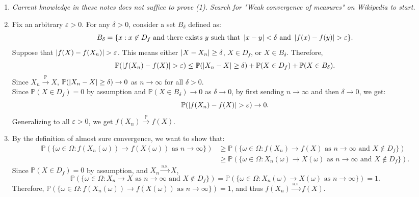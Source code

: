 \documentclass{huhtakm-template-book-v2}
\newcommand{\prob}{\mathbb{P}}
\begin{document}
    \begin{proofing}
        \begin{enumerate}
            \item \textit{Current knowledge in these notes does not suffice to prove (1). Search for "Weak convergence of measures" on Wikipedia to start.}
            \item Fix an arbitrary $\varepsilon > 0$. For any $\delta > 0$, consider a set $B_{\delta}$ defined as:
            \begin{equation*}
                B_{\delta} = \{x:x \not \in D_{f}\text{ and there exists }y\text{ such that }\left|{x-y}\right| < \delta\text{ and }\left|{f(x)-f(y)}\right| > \varepsilon\}.
            \end{equation*}
            Suppose that $\left|{f(X)-f(X_{n})}\right| > \varepsilon$. This means either $\left|{X-X_{n}}\right| \geq \delta$, $X \in D_{f}$, or $X \in B_{\delta}$. Therefore,
            \begin{equation*}
                \prob(\abs{f(X_{n})-f(X)} > \varepsilon) \leq \prob(\abs{X_{n}-X} \geq \delta)+\prob(X \in D_{f})+\prob(X \in B_{\delta}).
            \end{equation*}
            Since $X_{n} \xrightarrow{\prob} X$, $\prob(\abs{X_{n}-X} \geq \delta) \to 0$ as $n \to \infty$ for all $\delta > 0$.\\ 
            Since $\prob(X \in D_{f}) = 0$ by assumption and $\prob(X \in B_{\delta}) \to 0$ as $\delta \to 0$, by first sending $n \to \infty$ and then $\delta \to 0$, we get:
            \begin{equation*}
                \prob(\abs{f(X_{n})-f(X)} > \varepsilon) \to 0.
            \end{equation*}
            Generalizing to all $\varepsilon > 0$, we get $f(X_{n}) \xrightarrow{\prob} f(X)$.
            \item By the definition of almost sure convergence, we want to show that:
            \begin{align*}
                \prob(\{\omega \in \Omega:f(X_{n}(\omega)) \to f(X(\omega))\text{ as }n \to \infty\}) &\geq \prob(\{\omega \in \Omega:f(X_{n}) \to f(X)\text{ as }n \to \infty\text{ and }X \not \in D_{f}\})\\
                &\geq \prob(\{\omega \in \Omega:X_{n}(\omega) \to X(\omega)\text{ as }n \to \infty\text{ and }X \not \in D_{f}\}).
            \end{align*}
            Since $\prob(X \in D_{f}) = 0$ by assumption, and $X_{n} \xrightarrow{\text{a.s.}} X$,
            \begin{equation*}
                \prob(\{\omega \in \Omega:X_{n} \to X\text{ as }n \to \infty\text{ and }X \not \in D_{f}\}) = \prob(\{\omega \in \Omega:X_{n}(\omega) \to X(\omega)\text{ as }n \to \infty\}) = 1.
            \end{equation*}
            Therefore, $\prob(\{\omega \in \Omega:f(X_{n}(\omega)) \to f(X(\omega))\text{ as }n \to \infty\}) = 1$, and thus $f(X_{n}) \xrightarrow{\text{a.s.}} f(X)$.
        \end{enumerate}
    \end{proofing}
    \newpage
\end{document}
